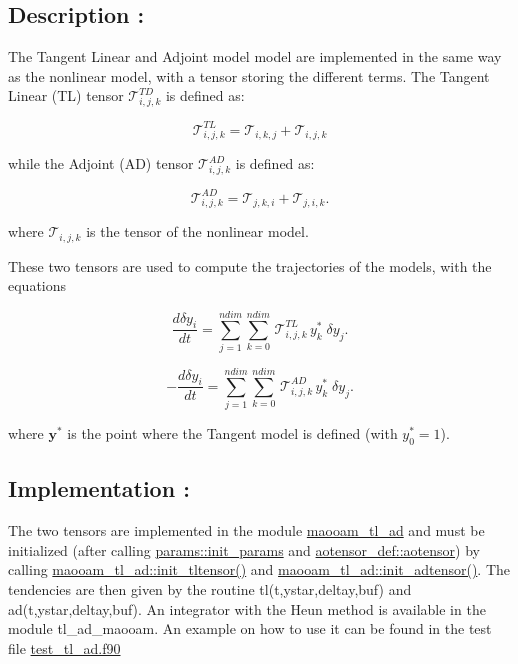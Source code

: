 \subsection*{Description \-:}

The Tangent Linear and Adjoint model model are implemented in the same way as the nonlinear model, with a tensor storing the different terms. The Tangent Linear (T\-L) tensor $\mathcal{T}_{i,j,k}^{TD}$ is defined as\-:

\[ \mathcal{T}_{i,j,k}^{TL} = \mathcal{T}_{i,k,j} + \mathcal{T}_{i,j,k} \]

while the Adjoint (A\-D) tensor $\mathcal{T}_{i,j,k}^{AD}$ is defined as\-:

\[ \mathcal{T}_{i,j,k}^{AD} = \mathcal{T}_{j,k,i} + \mathcal{T}_{j,i,k} . \]

where $ \mathcal{T}_{i,j,k}$ is the tensor of the nonlinear model.

These two tensors are used to compute the trajectories of the models, with the equations

\[ \frac{d\delta y_i}{dt} = \sum_{j=1}^{ndim}\sum_{k=0}^{ndim} \, \mathcal{T}_{i,j,k}^{TL} \, y^{\ast}_k \; \delta y_j . \]

\[ -\frac{d\delta y_i}{dt} = \sum_{j=1}^{ndim} \sum_{k=0}^{ndim} \, \mathcal{T}_{i,j,k}^{AD} \, y^{\ast}_k \; \delta y_j . \]

where $\boldsymbol{y}^{\ast}$ is the point where the Tangent model is defined (with $y_0^{\ast}=1$).

\subsection*{Implementation \-:}

The two tensors are implemented in the module \hyperlink{classmaooam__tl__ad}{maooam\-\_\-tl\-\_\-ad} and must be initialized (after calling \hyperlink{classparams_aa5d1f7f88b00cf3705691de2f6f92a08}{params\-::init\-\_\-params} and \hyperlink{classaotensor__def_a0dc43bc9294a18f2fe57b67489f1702f}{aotensor\-\_\-def\-::aotensor}) by calling \hyperlink{classmaooam__tl__ad_aa9fa649b66f2ea950fc6a14fafa2f97e}{maooam\-\_\-tl\-\_\-ad\-::init\-\_\-tltensor()} and \hyperlink{classmaooam__tl__ad_a5fa938c70062d80a0bf3f02c477a3bb6}{maooam\-\_\-tl\-\_\-ad\-::init\-\_\-adtensor()}. The tendencies are then given by the routine tl(t,ystar,deltay,buf) and ad(t,ystar,deltay,buf). An integrator with the Heun method is available in the module tl\-\_\-ad\-\_\-maooam. An example on how to use it can be found in the test file \hyperlink{test__tl__ad_8f90}{test\-\_\-tl\-\_\-ad.\-f90} 